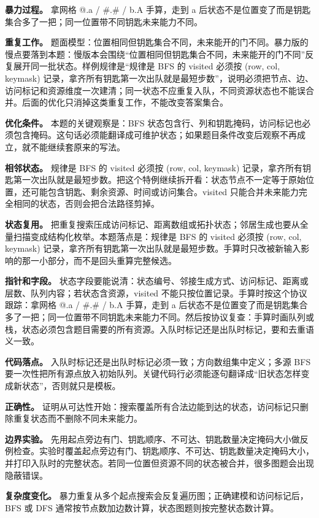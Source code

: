\textbf{暴力过程。} 拿网格 @.a / \#.\# / b.A 手算，走到 a 后状态不是位置变了而是钥匙集合多了一把；同一位置带不同钥匙未来能力不同。

\textbf{重复工作。} 题面模型：位置相同但钥匙集合不同，未来能开的门不同。暴力版的慢点要落到本题：慢版本会围绕“位置相同但钥匙集合不同，未来能开的门不同”反复展开同一批状态。样例规律是“规律是 BFS 的 visited 必须按 (row, col, keymask) 记录，拿齐所有钥匙第一次出队就是最短步数”，说明必须把节点、边、访问标记和资源维度一次建清；同一状态不应重复入队，不同资源状态也不能误合并。后面的优化只消掉这类重复工作，不能改变答案集合。

\textbf{优化条件。} 本题的关键观察是：BFS 状态包含行、列和钥匙掩码，访问标记也必须包含掩码。这句话必须能翻译成可维护状态；如果题目条件改变后观察不再成立，就不能继续套原来的写法。

\textbf{相邻状态。} 规律是 BFS 的 visited 必须按 (row, col, keymask) 记录，拿齐所有钥匙第一次出队就是最短步数。把这个特例继续拆开看：状态节点不一定等于原始位置，还可能包含钥匙、剩余资源、时间或访问集合。visited 只能合并未来能力完全相同的状态，否则会把合法路径剪掉。

\textbf{状态复用。} 把重复搜索压成访问标记、距离数组或拓扑状态；邻居生成也要从全量扫描变成结构化枚举。本题落点是：规律是 BFS 的 visited 必须按 (row, col, keymask) 记录，拿齐所有钥匙第一次出队就是最短步数。手算时只改被新输入影响的那一小部分，而不是回头重算完整候选。

\textbf{指针和字段。} 状态字段要能说清：状态编号、邻接生成方式、访问标记、距离或层数、队列内容；若状态含资源，visited 不能只按位置记录。手算时按这个协议跟踪：拿网格 @.a / \#.\# / b.A 手算，走到 a 后状态不是位置变了而是钥匙集合多了一把；同一位置带不同钥匙未来能力不同。然后按协议复查：手算时画队列或栈，状态必须包含题目需要的所有资源。入队时标记还是出队时标记，要和去重语义一致。

\textbf{代码落点。} 入队时标记还是出队时标记必须一致；方向数组集中定义；多源 BFS 要一次性把所有源点放入初始队列。关键代码行必须能逐句翻译成“旧状态怎样变成新状态”，否则就只是模板。

\textbf{正确性。} 证明从可达性开始：搜索覆盖所有合法边能到达的状态，访问标记只删除重复状态而不删除不同未来能力。

\textbf{边界实验。} 先用起点旁边有门、钥匙顺序、不可达、钥匙数量决定掩码大小做反例检查。实验时覆盖起点旁边有门、钥匙顺序、不可达、钥匙数量决定掩码大小，并打印入队时的完整状态。若同一位置但资源不同的状态被合并，很多图题会出现隐蔽错误。

\textbf{复杂度变化。} 暴力重复从多个起点搜索会反复遍历图；正确建模和访问标记后，BFS 或 DFS 通常按节点数加边数计算，状态图题则按完整状态数计算。


